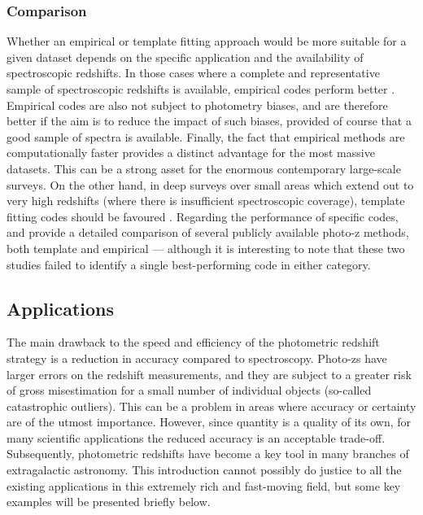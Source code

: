 \subsubsection{Comparison}\label{subsubsection:intro_comparison}
Whether an empirical or template fitting approach would be more suitable for a given dataset depends on the specific application and the availability of spectroscopic redshifts. In those cases where a complete and representative sample of spectroscopic redshifts is available, empirical codes perform better \citep{2011MNRAS.417.1891A,2019NatAs...3..212S}. Empirical codes are also not subject to photometry biases, and are therefore better if the aim is to reduce the impact of such biases, provided of course that a good sample of spectra is available. Finally, the fact that empirical methods are computationally faster provides a distinct advantage for the most massive datasets. This can be a strong asset for the enormous contemporary large-scale surveys. On the other hand, in deep surveys over small areas which extend out to very high redshifts (where there is insufficient spectroscopic coverage), template fitting codes should be favoured \citep{2010A&A...523A..31H}. Regarding the performance of specific codes, \cite{2010A&A...523A..31H} and \cite{2011MNRAS.417.1891A} provide a detailed comparison of several publicly available photo-z methods, both template and empirical --- although it is interesting to note that these two studies failed to identify a single best-performing code in either category. \par 
 

\subsection{Applications}\label{subsubsection:photoz_applications_intro}
The main drawback to the speed and efficiency of the photometric redshift strategy is a reduction in accuracy compared to spectroscopy. Photo-zs have larger errors on the redshift measurements, and they are subject to a greater risk of gross misestimation for a small number of individual objects (so-called catastrophic outliers). This can be a problem in areas where accuracy or certainty are of the utmost importance. However, since quantity is a quality of its own, for many scientific applications the reduced accuracy is an acceptable trade-off. Subsequently, photometric redshifts have become a key tool in many branches of extragalactic astronomy. This introduction cannot possibly do justice to all the existing applications in this extremely rich and fast-moving field, but some key examples will be presented briefly below. \par 


